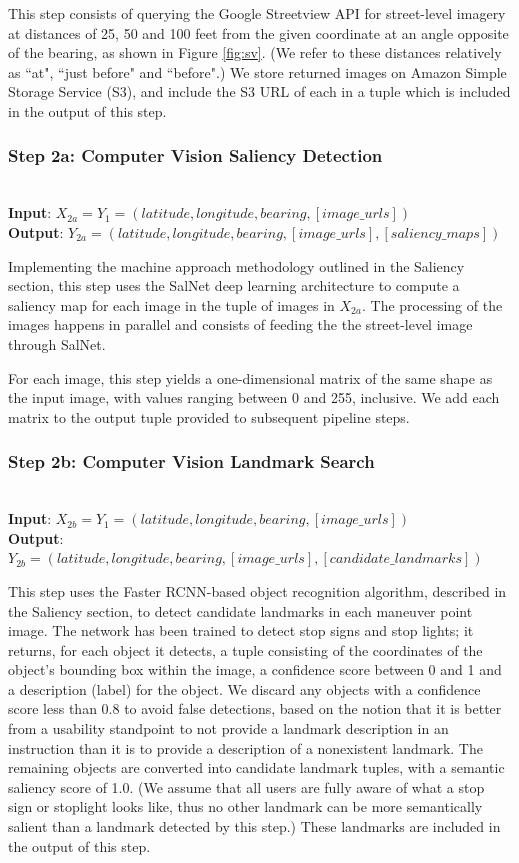 This step consists of querying the Google Streetview API for street-level imagery at distances of 25, 50 and 100 feet from the given coordinate at an angle opposite of the bearing, as shown in Figure \ref{fig:sv}. (We refer to these distances relatively as ``at", ``just before" and ``before".) We store returned images on Amazon Simple Storage Service (S3), and include the S3 URL of each in a tuple which is included in the output of this step. 

\subsubsection*{Step 2a: Computer Vision Saliency Detection}~\\
\noindent\textbf{Input}: $X_{2a} = Y_1 = (latitude, longitude, bearing, [image\_urls])$\\
\textbf{Output}: $Y_{2a} = (latitude, longitude, bearing, [image\_urls], [saliency\_maps])$ 

Implementing the machine approach methodology outlined in the Saliency section, this step uses the SalNet deep learning architecture to compute a saliency map for each image in the tuple of images in $X_{2a}$. The processing of the images happens in parallel and consists of feeding the the street-level image through SalNet.

For each image, this step yields a one-dimensional matrix of the same shape as the input image, with values ranging between 0 and 255, inclusive. We add each matrix to the output tuple provided to subsequent pipeline steps.

\subsubsection*{Step 2b: Computer Vision Landmark Search}~\\
\noindent\textbf{Input}: $X_{2b} = Y_1 = (latitude, longitude, bearing, [image\_urls])$\\
\textbf{Output}: $Y_{2b} = (latitude, longitude, bearing,  [image\_urls], [candidate\_landmarks] )$ 

This step uses the Faster RCNN-based object recognition algorithm, described in the Saliency section, to detect candidate landmarks in each maneuver point image. The network has been trained to detect stop signs and stop lights; it returns, for each object it detects, a tuple consisting of the coordinates of the object’s bounding box within the image, a confidence score between 0 and 1 and a description (label) for the object. We discard any objects with a confidence score less than 0.8 to avoid false detections, based on the notion that it is better from a usability standpoint to not provide a landmark description in an instruction than it is to provide a description of a nonexistent landmark. The remaining objects are converted into candidate landmark tuples, with a semantic saliency score of 1.0. (We assume that all users are fully aware of what a stop sign or stoplight looks like, thus no other landmark can be more semantically salient than a landmark detected by this step.) These landmarks are included in the output of this step.

